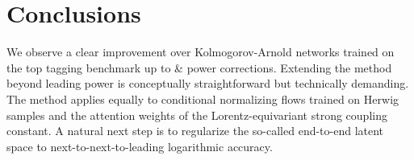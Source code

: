 \section{Conclusions}\label{sec:conclusions}

We observe a clear improvement over Kolmogorov-Arnold networks trained
on the top tagging benchmark up to & power corrections. Extending the
method beyond leading power is conceptually straightforward but
technically demanding. The method applies equally to conditional
normalizing flows trained on Herwig samples and the attention weights of
the Lorentz-equivariant strong coupling constant. A natural next step is
to regularize the so-called end-to-end latent space to
next-to-next-to-leading logarithmic accuracy.

